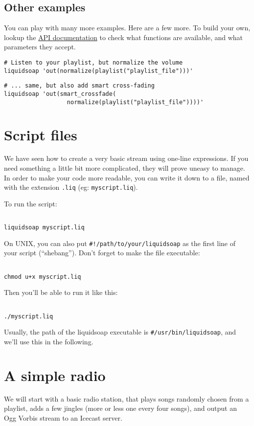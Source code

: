 \subsection{Other examples}
You can play with many more examples. Here are a few more. To build your own,
lookup the \href{reference.html}{API documentation} to check what functions are
available, and what parameters they accept.

\begin{verbatim}
# Listen to your playlist, but normalize the volume
liquidsoap 'out(normalize(playlist("playlist_file")))'
\end{verbatim}
\begin{verbatim}
# ... same, but also add smart cross-fading
liquidsoap 'out(smart_crossfade(
                  normalize(playlist("playlist_file"))))'
\end{verbatim}
\section{Script files}
We have seen how to create a very basic stream using one-line expressions. If
you need something a little bit more complicated, they will prove uneasy to
manage. In order to make your code more readable, you can write it down to a
file, named with the extension \verb+.liq+ (eg: \verb+myscript.liq+).

To run the script:

\begin{verbatim}

liquidsoap myscript.liq
\end{verbatim}
On UNIX, you can also put \verb+#!/path/to/your/liquidsoap+ as the first line of
your script (``shebang''). Don't forget to make the file executable:

\begin{verbatim}

chmod u+x myscript.liq
\end{verbatim}
Then you'll be able to run it like this:

\begin{verbatim}

./myscript.liq
\end{verbatim}
Usually, the path of the liquidsoap executable is \verb+#/usr/bin/liquidsoap+,
and we'll use this in the following.

\section{A simple radio}
We will start with a basic radio station, that plays songs randomly chosen from
a playlist, adds a few jingles (more or less one every four songs), and output
an Ogg Vorbis stream to an Icecast server.

